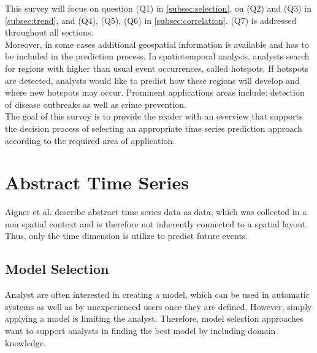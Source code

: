 \documentclass[electronic]{vgtc}             %
\begin{document}
This survey will focus on question (Q1) in \autoref{subsec:selection}, on (Q2) and (Q3) in \autoref{subsec:trend}, and (Q4), (Q5), (Q6) in \autoref{subsec:correlation}.
(Q7) is addressed throughout all sections.\\
Moreover, in some cases additional geospatial information is available and has to be included in the prediction process. 
In spatiotemporal analysis, analysts search for regions with higher than usual event occurrences, called hotspots.
If hotspots are detected, analysts would like to predict how these regions will develop and where new hotspots may occur.
Prominent applications areas include: detection of disease outbreaks as well as crime prevention. \\
The goal of this survey is to provide the reader with an overview that supports  the decision process of selecting an appropriate time series prediction approach according to the required area of application.


\section{Abstract Time Series\label{sec:temporal}}
Aigner et al. \cite{Aigner:2007} describe abstract time series data as data, which was collected in a non spatial context and is therefore not inherently connected to a spatial layout.  
Thus, only the time dimension is utilize to predict future events.

\subsection{Model Selection\label{subsec:selection}}
Analyst are often interested in creating a model, which can be used in automatic systems as well as by unexperienced users once they are defined. 
However, simply applying a model is limiting the analyst. 
Therefore, model selection approaches want to support analysts in finding the best model by including domain knowledge. 
\end{document}
